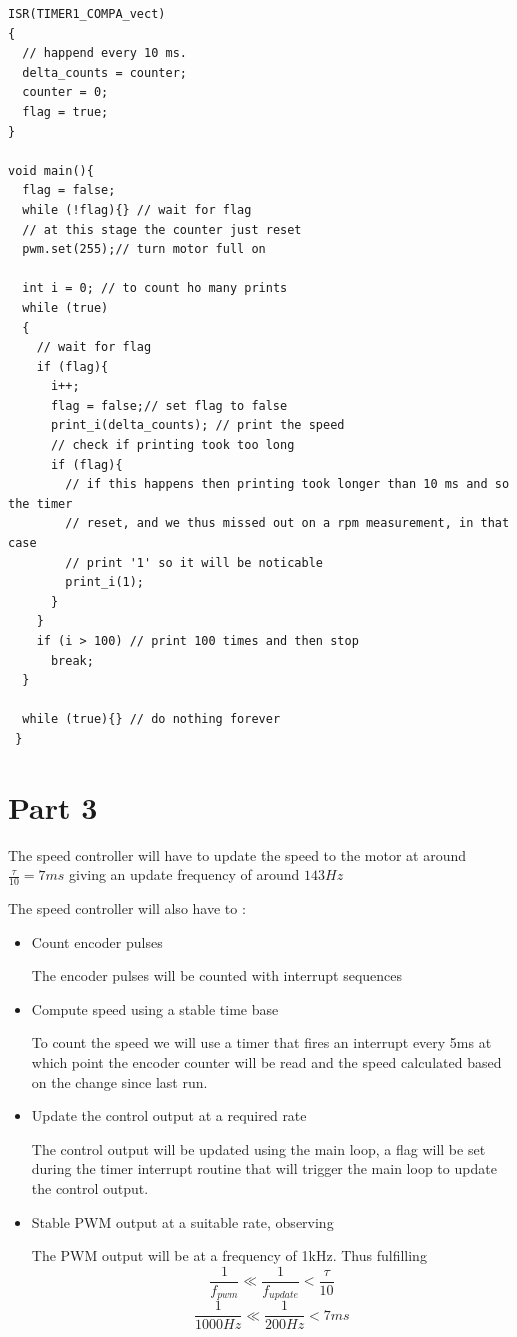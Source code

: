 \documentclass{article}
\newcommand{\timerinterval}{5ms }
\begin{document}
\begin{lstlisting}[caption=The relevant lines from the code used when measuring the motor response]
ISR(TIMER1_COMPA_vect)
{
  // happend every 10 ms.
  delta_counts = counter;
  counter = 0;
  flag = true;
}

void main(){
  flag = false;
  while (!flag){} // wait for flag
  // at this stage the counter just reset 
  pwm.set(255);// turn motor full on
  
  int i = 0; // to count ho many prints
  while (true)
  {
    // wait for flag
    if (flag){
      i++;
      flag = false;// set flag to false
      print_i(delta_counts); // print the speed
      // check if printing took too long
      if (flag){
        // if this happens then printing took longer than 10 ms and so the timer
        // reset, and we thus missed out on a rpm measurement, in that case
        // print '1' so it will be noticable
        print_i(1);
      }
    }
    if (i > 100) // print 100 times and then stop
      break;
  }
 
  while (true){} // do nothing forever
 }
\end{lstlisting}

\section*{Part 3}
The speed controller will have to update the speed to the motor at around $\frac{\tau}{10} = 7 ms$ giving an update frequency of around $143 Hz$

The speed controller will also have to :

\begin{itemize}
    \item Count encoder pulses
    \begin{description}
    The encoder pulses will be counted with interrupt sequences 
    \end{description}
    \item Compute speed using a stable time base
    \begin{description}
    To count the speed we will use a timer that fires an interrupt every \timerinterval at which point the encoder counter will be read and the speed calculated based on the change since last run.
    \end{description}
    \item Update the control output at a required rate
    \begin{description}
    The control output will be updated using the main loop, a flag will be set during the timer interrupt routine that will trigger the main loop to update the control output.
    \end{description}
    \item Stable PWM output at a suitable rate, observing
    \begin{description}
    The PWM output will be at a frequency of 1kHz. Thus fulfilling 
    \[ \frac{1}{f_{pwm}} \ll  \frac{1}{f_{update}} < \frac{\tau}{10}\]
    \[ \frac{1}{1000Hz} \ll \frac{1}{200Hz} < 7ms \]
    \end{description}

\end{itemize}
\end{document}
